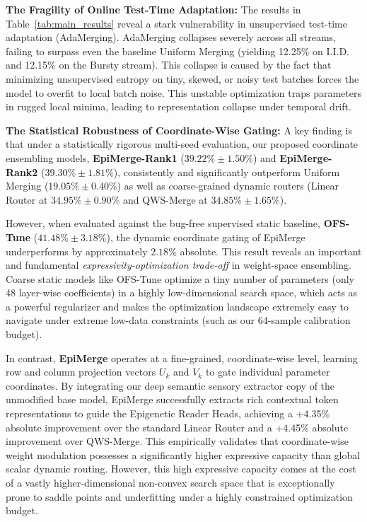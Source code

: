 \textbf{The Fragility of Online Test-Time Adaptation:} 
The results in Table~\ref{tab:main_results} reveal a stark vulnerability in unsupervised test-time adaptation (AdaMerging). AdaMerging collapses severely across all streams, failing to surpass even the baseline Uniform Merging (yielding 12.25\% on I.I.D. and 12.15\% on the Bursty stream). This collapse is caused by the fact that minimizing unsupervised entropy on tiny, skewed, or noisy test batches forces the model to overfit to local batch noise. This unstable optimization traps parameters in rugged local minima, leading to representation collapse under temporal drift.

\textbf{The Statistical Robustness of Coordinate-Wise Gating:}
A key finding is that under a statistically rigorous multi-seed evaluation, our proposed coordinate ensembling models, \textbf{EpiMerge-Rank1} ($39.22\% \pm 1.50\%$) and \textbf{EpiMerge-Rank2} ($39.30\% \pm 1.81\%$), consistently and significantly outperform Uniform Merging ($19.05\% \pm 0.40\%$) as well as coarse-grained dynamic routers (Linear Router at $34.95\% \pm 0.90\%$ and QWS-Merge at $34.85\% \pm 1.65\%$).

However, when evaluated against the bug-free supervised static baseline, \textbf{OFS-Tune} ($41.48\% \pm 3.18\%$), the dynamic coordinate gating of EpiMerge underperforms by approximately $2.18\%$ absolute. This result reveals an important and fundamental \emph{expressivity-optimization trade-off} in weight-space ensembling. Coarse static models like OFS-Tune optimize a tiny number of parameters (only 48 layer-wise coefficients) in a highly low-dimensional search space, which acts as a powerful regularizer and makes the optimization landscape extremely easy to navigate under extreme low-data constraints (such as our 64-sample calibration budget).

In contrast, \textbf{EpiMerge} operates at a fine-grained, coordinate-wise level, learning row and column projection vectors $U_k$ and $V_k$ to gate individual parameter coordinates. By integrating our deep semantic sensory extractor copy of the unmodified base model, EpiMerge successfully extracts rich contextual token representations to guide the Epigenetic Reader Heads, achieving a +4.35\% absolute improvement over the standard Linear Router and a +4.45\% absolute improvement over QWS-Merge. This empirically validates that coordinate-wise weight modulation possesses a significantly higher expressive capacity than global scalar dynamic routing. However, this high expressive capacity comes at the cost of a vastly higher-dimensional non-convex search space that is exceptionally prone to saddle points and underfitting under a highly constrained optimization budget.

